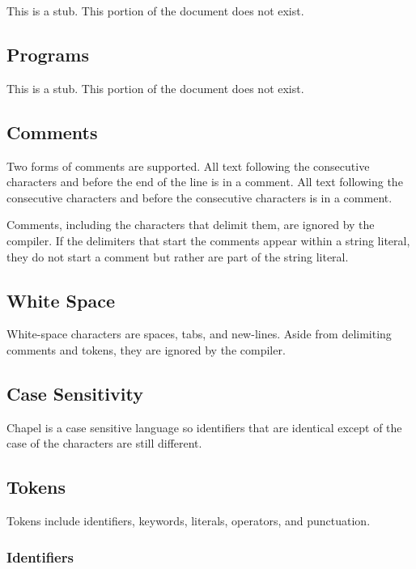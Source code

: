 \label{Lexical_Structure}

This is a stub.  This portion of the document does not exist.

\subsection{Programs}
\label{Programs}

This is a stub.  This portion of the document does not exist.

\subsection{Comments}
\label{Comments}

Two forms of comments are supported.  All text following the
consecutive characters \chpl{//} and before the end of the line is in
a comment.  All text following the consecutive characters \chpl{/*}
and before the consecutive characters \chpl{*/} is in a comment.

Comments, including the characters that delimit them, are ignored by
the compiler.  If the delimiters that start the comments appear within
a string literal, they do not start a comment but rather are part of
the string literal.

\subsection{White Space}
\label{White_Space}

White-space characters are spaces, tabs, and new-lines.  Aside from
delimiting comments and tokens, they are ignored by the compiler.

\subsection{Case Sensitivity}
\label{Case_Sensitivity}

Chapel is a case sensitive language so identifiers that are identical
except of the case of the characters are still different.

\subsection{Tokens}
\label{Tokens}

Tokens include identifiers, keywords, literals, operators, and
punctuation.

\subsubsection{Identifiers}
\label{Identifiers}

